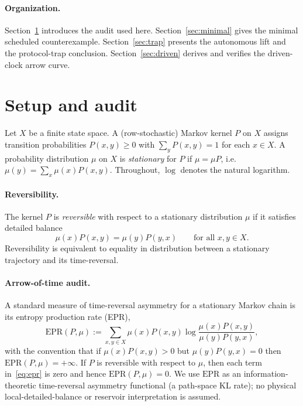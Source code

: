 \documentclass[11pt]{article}
\begin{document}
\paragraph{Organization.}
Section~\ref{sec:setup} introduces the audit used here. Section~\ref{sec:minimal} gives the minimal scheduled counterexample. Section~\ref{sec:trap} presents the autonomous lift and the protocol-trap conclusion. Section~\ref{sec:driven} derives and verifies the driven-clock arrow curve.
 \section{Setup and audit}\label{sec:setup}

Let \(X\) be a finite state space. A (row-stochastic) Markov kernel \(P\) on \(X\) assigns transition probabilities \(P(x,y)\ge 0\) with \(\sum_y P(x,y)=1\) for each \(x\in X\). A probability distribution \(\mu\) on \(X\) is \emph{stationary} for \(P\) if \(\mu=\mu P\), i.e.\ \(\mu(y)=\sum_x \mu(x)P(x,y)\). Throughout, \(\log\) denotes the natural logarithm.

\paragraph{Reversibility.}
The kernel \(P\) is \emph{reversible} with respect to a stationary distribution \(\mu\) if it satisfies detailed balance
\begin{equation}\label{eq:db}
\mu(x)P(x,y)=\mu(y)P(y,x)\qquad \text{for all }x,y\in X.
\end{equation}
Reversibility is equivalent to equality in distribution between a stationary trajectory and its time-reversal.

\paragraph{Arrow-of-time audit.}
A standard measure of time-reversal asymmetry for a stationary Markov chain is its entropy production rate (EPR),
\begin{equation}\label{eq:epr}
\mathrm{EPR}(P,\mu)
:=\sum_{x,y\in X}\mu(x)P(x,y)\log\frac{\mu(x)P(x,y)}{\mu(y)P(y,x)},
\end{equation}
with the convention that if \(\mu(x)P(x,y)>0\) but \(\mu(y)P(y,x)=0\) then \(\mathrm{EPR}(P,\mu)=+\infty\). If \(P\) is reversible with respect to \(\mu\), then each term in~\eqref{eq:epr} is zero and hence \(\mathrm{EPR}(P,\mu)=0\).
We use \(\mathrm{EPR}\) as an information-theoretic time-reversal asymmetry functional (a path-space KL rate); no physical local-detailed-balance or reservoir interpretation is assumed.
\end{document}
